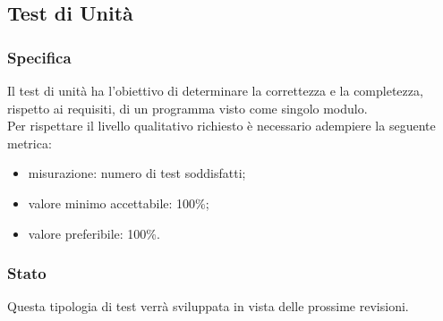 \subsection{Test di Unità}

	\subsubsection{Specifica}
		Il test di unità ha l'obiettivo di determinare la correttezza e la completezza, rispetto ai requisiti, di un programma visto come singolo modulo.\\
		Per rispettare il livello qualitativo richiesto è necessario adempiere la seguente metrica:
		\begin{itemize}
			\item{misurazione: numero di test soddisfatti;}
			\item{valore minimo accettabile: 100\%;}
			\item{valore preferibile: 100\%.}
		\end{itemize}
	
	
	\subsubsection{Stato}
		Questa tipologia di test verrà sviluppata in vista delle prossime revisioni.